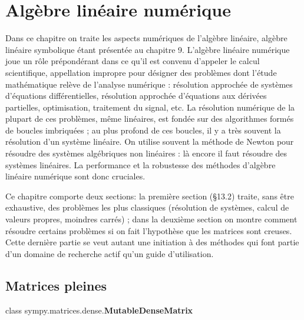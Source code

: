 \chapter{Algèbre linéaire numérique}
Dans ce chapitre on traite les aspects numériques de l'algèbre linéaire, algèbre linéaire symbolique étant présentée au chapitre 9. L'algèbre linéaire numérique joue un rôle prépondérant dans ce qu'il est convenu d'appeler le calcul scientifique, appellation impropre pour désigner des problèmes dont l'étude mathématique relève de l'analyse numérique : résolution approchée de systèmes d'équations différentielles, résolution approchée d'équations aux dérivées partielles, optimisation, traitement du signal, etc. La résolution numérique de la plupart de ces problèmes, même linéaires, est fondée sur des algorithmes formés de boucles imbriquées ; au plus profond de ces boucles, il y a très souvent la résolution d'un système linéaire. On utilise souvent
la méthode de Newton pour résoudre des systèmes algébriques non linéaires : là encore il faut résoudre des systèmes linéaires. 
La performance et la robustesse des méthodes d'algèbre linéaire numérique sont donc cruciales.


Ce chapitre comporte deux sections: la première section (§13.2) traite, sans être exhaustive, des problèmes les 
plus classiques (résolution de systèmes, calcul de valeurs propres, moindres carrés) ; dans la deuxième section on 
montre comment résoudre certains problèmes si on fait l'hypothèse que les matrices sont creuses. Cette dernière partie se veut
autant une initiation à des méthodes qui font partie d'un domaine de recherche actif qu'un guide d'utilisation.

\section{Matrices pleines}
class sympy.matrices.dense.\textbf{MutableDenseMatrix}
